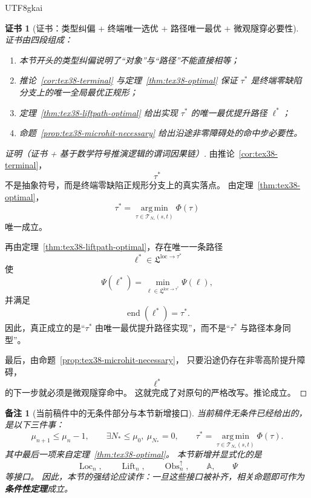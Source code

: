 \documentclass[12pt]{article}
\newtheorem{remark}{备注}[section]
\newtheorem{Certificate}{证书}[section]
\newcommand{\Obs}{\operatorname{Obs}}
\newcommand{\Lift}{\operatorname{Lift}}
\begin{document}
\begin{CJK*}{UTF8}{gkai}
\begin{Certificate}[证书：类型纠偏 + 终端唯一选优 + 路径唯一最优 + 微观隧穿必要性]
\label{cert:tex38-liftpath-strict}
证书由四段组成：
\begin{enumerate}
  \item 本节开头的类型纠偏说明了“对象”与“路径”不能直接相等；
  \item 推论~\ref{cor:tex38-terminal} 与定理~\ref{thm:tex38-optimal} 保证 $\tau^\ast$ 是终端零缺陷分支上的唯一全局最优正规形；
  \item 定理~\ref{thm:tex38-liftpath-optimal} 给出实现 $\tau^\ast$ 的唯一最优提升路径 $\ell^\ast$；
  \item 命题~\ref{prop:tex38-microhit-necessary} 给出沿途非零障碍处的命中步必要性。
\end{enumerate}
\end{Certificate}

\begin{proof}[证明（证书 + 基于数学符号推演逻辑的谓词因果链）]
由推论~\ref{cor:tex38-terminal}，
\[
  \tau^\ast
\]
不是抽象符号，而是终端零缺陷正规形分支上的真实落点。
由定理~\ref{thm:tex38-optimal}，
\[
  \tau^\ast
  =
  \operatorname*{arg\,min}_{\tau\in\mathcal T_{N_\ast}(s,t)}\Phi(\tau)
\]
唯一成立。

再由定理~\ref{thm:tex38-liftpath-optimal}，存在唯一一条路径
\[
  \ell^\ast\in\mathfrak L^{\mathrm{loc}\to\tau^\ast}
\]
使
\[
  \Psi(\ell^\ast)
  =
  \min_{\ell\in\mathfrak L^{\mathrm{loc}\to\tau^\ast}}
  \Psi(\ell),
\]
并满足
\[
  \operatorname{end}(\ell^\ast)=\tau^\ast.
\]
因此，真正成立的是“$\tau^\ast$ 由唯一最优提升路径实现”，而不是“$\tau^\ast$ 与路径本身同型”。

最后，由命题~\ref{prop:tex38-microhit-necessary}，
只要沿途仍存在非零高阶提升障碍，
\[
  \ell^\ast
\]
的下一步就必须是微观隧穿命中。
这就完成了对原句的严格改写。推论成立。
\end{proof}

\begin{remark}[当前稿件中的无条件部分与本节新增接口]
当前稿件无条件已经给出的，是以下三件事：
\[
  \mu_{n+1}\le\mu_n-1,
  \qquad
  \exists N_\ast\le\mu_0,\ \mu_{N_\ast}=0,
  \qquad
  \tau^\ast
  =
  \operatorname*{arg\,min}_{\tau\in\mathcal T_{N_\ast}(s,t)}
  \Phi(\tau).
\]
其中最后一项来自定理~\ref{thm:tex38-optimal}。
本节新增并显式化的是
\[
  \operatorname{Loc}_n,\qquad
  \Lift_n,\qquad
  \Obs_n^\uparrow,\qquad
  \mathbb A,\qquad
  \Psi
\]
等接口。
因此，本节的强结论应读作：一旦这些接口被补齐，相关命题即可作为\textbf{条件性定理}成立。
\end{remark}


\end{CJK*}
\end{document}
